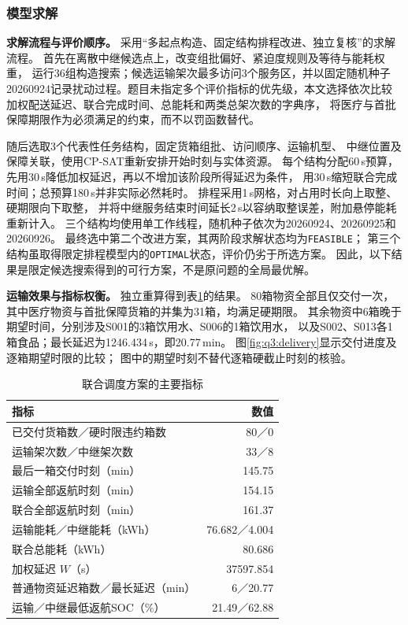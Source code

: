 \subsubsection{模型求解}
\label{sec:q3:solution}

\textbf{求解流程与评价顺序。}
采用“多起点构造、固定结构排程改进、独立复核”的求解流程。
首先在离散中继候选点上，改变组批偏好、紧迫度规则及等待与能耗权重，
运行36组构造搜索；候选运输架次最多访问3个服务区，并以固定随机种子
20260924记录扰动过程。题目未指定多个评价指标的优先级，本文选择依次比较
加权配送延迟、联合完成时间、总能耗和两类总架次数的字典序，
将医疗与首批保障期限作为必须满足的约束，而不以罚函数替代。

随后选取3个代表性任务结构，固定货箱组批、访问顺序、运输机型、
中继位置及保障关联，使用CP-SAT重新安排开始时刻与实体资源。
每个结构分配60\,s预算，先用30\,s降低加权延迟，再以不增加该阶段所得延迟为条件，
用30\,s缩短联合完成时间；总预算180\,s并非实际必然耗时。
排程采用1\,s网格，对占用时长向上取整、硬期限向下取整，
并将中继服务结束时间延长2\,s以容纳取整误差，附加悬停能耗重新计入。
三个结构均使用单工作线程，随机种子依次为20260924、20260925和20260926。
最终选中第二个改进方案，其两阶段求解状态均为\texttt{FEASIBLE}；
第三个结构虽取得限定排程模型内的\texttt{OPTIMAL}状态，评价仍劣于所选方案。
因此，以下结果是限定候选搜索得到的可行方案，不是原问题的全局最优解。

\textbf{运输效果与指标权衡。}
独立重算得到表\ref{tab:q3:overall}的结果。
80箱物资全部且仅交付一次，其中医疗物资与首批保障货箱的并集为31箱，均满足硬期限。
其余物资中6箱晚于期望时间，分别涉及S001的3箱饮用水、S006的1箱饮用水，
以及S002、S013各1箱食品；最长延迟为1246.434\,s，即20.77\,min。
图\ref{fig:q3:delivery}显示交付进度及逐箱期望时限的比较；
图中的期望时刻不替代逐箱硬截止时刻的核验。

\begin{table}[htbp]
  \centering
  \caption{联合调度方案的主要指标}
  \label{tab:q3:overall}
  \begin{tabular}{lr}
    \toprule
    指标 & 数值 \\
    \midrule
    已交付货箱数／硬时限违约箱数 & 80／0 \\
    运输架次数／中继架次数 & 33／8 \\
    最后一箱交付时刻（min） & 145.75 \\
    运输全部返航时刻（min） & 154.15 \\
    联合全部返航时刻（min） & 161.37 \\
    运输能耗／中继能耗（kWh） & 76.682／4.004 \\
    联合总能耗（kWh） & 80.686 \\
    加权延迟 $W$（s） & 37597.854 \\
    普通物资延迟箱数／最长延迟（min） & 6／20.77 \\
    运输／中继最低返航SOC（\%） & 21.49／62.88 \\
    \bottomrule
  \end{tabular}
\end{table}

